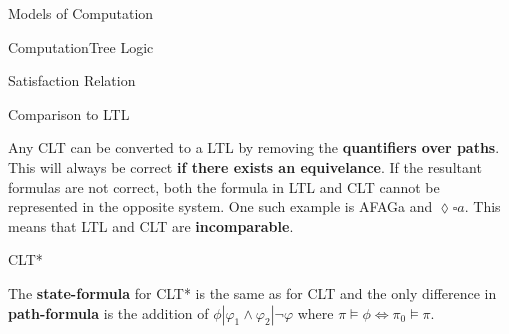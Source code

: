 \documentclass[12pt, letterpaper]{article}
\begin{document}
\begin{section}{Models of Computation}
\begin{subsection}{ComputationTree Logic}
\begin{subsubsection}{Satisfaction Relation}
    \end{subsubsection}

    \begin{subsubsection}{Comparison to LTL}

      Any CLT can be converted to a LTL by removing the \textbf{quantifiers over
        paths}. This will always be correct \textbf{if there exists an equivelance}.
      If the resultant formulas are not correct, both the formula in LTL and CLT
      cannot be represented in the opposite system. One such example is AFAGa
      and \(\lozenge \square a\). This means that LTL and CLT are \textbf{incomparable}.

    \end{subsubsection}

    \begin{subsubsection}{CLT*}

      The \textbf{state-formula} for CLT* is the same as for CLT and the only
      difference in \textbf{path-formula} is the addition of
      \(\phi | \varphi_{1} \land \varphi_{2} | \lnot \varphi\) where
      \(\pi \models \phi \iff \pi_{0} \models \pi\).

    \end{subsubsection}

  \end{subsection}

\end{section}
\end{document}
